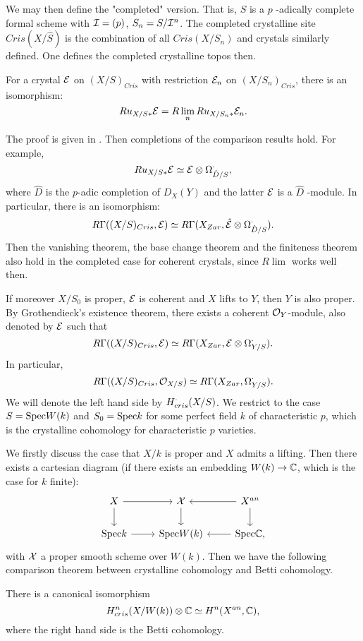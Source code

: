 We may then define the "completed" version. 
That is, $S$ is a $p$ -adically complete formal scheme with 
${\mathcal {I}} = (p)$, $S_n = S / {\mathcal {I}}^n$. 
The completed crystalline site $Cris(X/\hat{S})$ is 
the combination of all $Cris(X/S_n)$ and crystals similarly defined. 
One defines the completed crystalline topos then.
\begin{proposition}
    For a crystal ${\mathcal {E}}$ on $(X/S)_{Cris}$ 
    with restriction ${\mathcal {E}}_n$ on $(X/S_n)_{Cris}$, 
    there is an isomorphism:
    \[
        Ru_{X/S*} {\mathcal {E}} = R \lim_n Ru_{X/S_n*} {\mathcal {E}}_n.
    \]
\end{proposition}

The proof is given in \cite{BO}.
Then completions of the comparison results hold.
For example,
\[
    Ru_{X/S*} {\mathcal {E}} \simeq {\mathcal {E}} \otimes \Omega_{\hat{D}/S}^\cdot,
\]
where $\hat{D}$ is the $p$-adic completion of $D_X(Y)$ 
and the latter ${\mathcal {E}}$ is a $\hat{D}$ -module.
In particular, there is an isomorphism:
\[
    R \Gamma((X/S)_{Cris},{\mathcal {E}}) \simeq
    R \Gamma(X_{Zar}, \hat{{\mathcal {E}}} \otimes \Omega_{\hat{D}/S}^\cdot).
\]
Then the vanishing theorem, the base change theorem and the finiteness theorem 
also hold in the completed case for coherent crystals, 
since $R \lim$ works well then.

If moreover $X/S_0$ is proper, ${\mathcal {E}}$ is coherent 
and $X$ lifts to $Y$, then $Y$ is also proper. 
By Grothendieck's existence theorem, 
there exists a coherent ${\mathcal {O}}_Y$-module, 
also denoted by ${\mathcal {E}}$ such that 
\[
    R\Gamma((X/S)_{Cris},{\mathcal {E}}) \simeq 
    R\Gamma(X_{Zar},{\mathcal {E}}\otimes \Omega_{Y/S}^\cdot).
\]
In particular,
\[
    R\Gamma((X/S)_{Cris}, {\mathcal {O}}_{X/S}) \simeq 
    R \Gamma (X_{Zar}, \Omega_{Y/S}^\cdot).
\]
We will denote the left hand side by $H^\cdot_{cris}(X/S)$. 
We restrict to the case $S = \mathrm{Spec} W(k)$ and 
$S_0 = \mathrm{Spec} k$ for some perfect field $k$ of characteristic $p$, 
which is the crystalline cohomology for characteristic $p$ varieties.

We firstly discuss the case that $X/k$ is proper and $X$ admits a lifting. 
Then there exists a cartesian diagram 
(if there exists an embedding $W(k) \to {\mathbb {C}}$, which is the case for $k$ finite):
\[
    \begin{tikzcd}
        X \ar[r] \ar[d] & \CX \ar[d] & X^{an} \ar[l] \ar[d] \\
        \Spec k \ar[r] & \Spec W(k) & \Spec \BC \ar[l],
    \end{tikzcd}
\]
with ${\mathcal {X}}$ a proper smooth scheme over $W(k)$. 
Then we have the following comparison theorem 
between crystalline cohomology and Betti cohomology.
\begin{theorem}
    There is a canonical isomorphism 
    \[
        H^n_{cris}(X/W(k)) \otimes {\mathbb {C}} \simeq H^n(X^{an}, {\mathbb {C}}),
    \]
    where the right hand side is the Betti cohomology.
\end{theorem}

